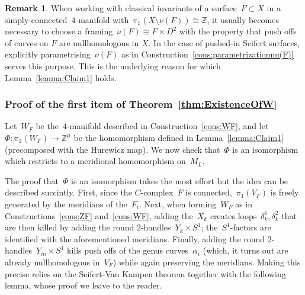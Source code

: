 \documentclass[10.9pt,a4paper]{amsart}
\theoremstyle{definition}
\newtheorem{remark}[theorem]{Remark}
\theoremstyle{remark}
\newcommand{\Z}{\mathbb{Z}}
\begin{document}
\begin{remark}
When working with classical invariants of a surface~$F \subset X$ in a simply-connected~$4$-manifold with~$\pi_1(X\setminus \nu(F)) \cong \Z$,  it usually becomes necessary to choose a framing~$\overline{\nu}(F) \cong F\times D^2$ with the property that push offs of curves on $F$ are nullhomologous in $X$.
In the case of pushed-in Seifert surfaces,  explicitly parametrising~$\overline{\nu}(F)$ as in Construction~\ref{cons:parametrizationnu(F)} serves this purpose.
This is the underlying reason for which Lemma~\ref{lemma:Claim1} holds.
\end{remark}



\subsubsection*{Proof of the first item of Theorem~\ref{thm:ExistenceOfW}}
Let~$W_F$ be the~$4$-manifold described in Construction~\ref{cons:WF}, and let~$\Phi\colon\pi_1(W_F)\to\Z^\mu$ be the homomorphism
defined in Lemma~\ref{lemma:Claim1} (precomposed with the Hurewicz map). We now check that~$\Phi$ is an isomorphism which restricts to a meridional
homomorphism on~$M_L$.


The proof that~$\Phi$ is an isomorphism takes the most effort but the idea can be described succintly.
First,  since the $C$-complex~$F$ is connected,~$\pi_1(V_F)$ is freely generated by the meridians of the~$F_i$.
Next, when forming~$W_F$ as in Constructions~\ref{cons:ZF} and~\ref{cons:WF},  adding the~$X_k$ creates loops~$\delta_k^1,\delta_k^2$ that are then killed by adding the round $2$-handles~$Y_k \times S^1$; the~$S^1$-factors are identified with the aforementioned meridians.
Finally, adding the round $2$-handles~$Y_m \times S^1$ kills push offs of the genus curves~$\alpha_i$ (which, it turns out are already nullhomologous in~$V_F$) while again preserving the meridians.
Making this precise relies on the Seifert-Van Kampen theorem together with the following lemma, whose proof we leave to the reader.
\end{document}
